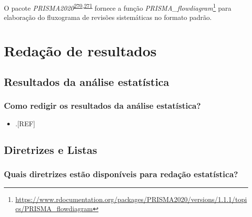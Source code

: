 \documentclass[
  a4paper,
]{book}
\providecommand{\tightlist}{%
  \setlength{\itemsep}{0pt}\setlength{\parskip}{0pt}}
\renewcommand{\href}[2]{#2\footnote{\url{#1}}}
\newenvironment{infobox}[1]
  {
  \begin{itemize}
  \renewcommand{\labelitemi}{
    \raisebox{-.7\height}[0pt][0pt]{
      {\setkeys{Gin}{width=3em,keepaspectratio}
        \texttt{[image: \#1]}}
    }
  }
  \setlength{\fboxsep}{1em}
  \begin{blackbox}
  \item
  }
  {
  \end{blackbox}
  \end{itemize}
  }
\begin{document}
\begin{infobox}{images/Rlogo}
O pacote \emph{PRISMA2020}\textsuperscript{\protect\hyperlink{ref-PRISMA2020-2}{270},\protect\hyperlink{ref-PRISMA2020}{271}} fornece a função \href{https://www.rdocumentation.org/packages/PRISMA2020/versions/1.1.1/topics/PRISMA_flowdiagram}{\emph{PRISMA\_flowdiagram}} para elaboração do fluxograma de revisões sistemáticas no formato padrão.

\end{infobox}

\hypertarget{redacao}{%
\chapter{\texorpdfstring{\textbf{Redação de resultados}}{Redação de resultados}}\label{redacao}}

\hypertarget{resultados-analise-estatistica}{%
\section{Resultados da análise estatística}\label{resultados-analise-estatistica}}

\hypertarget{como-redigir-os-resultados-da-anuxe1lise-estatuxedstica}{%
\subsection{Como redigir os resultados da análise estatística?}\label{como-redigir-os-resultados-da-anuxe1lise-estatuxedstica}}

\begin{itemize}
\tightlist
\item
  .{[}REF{]}
\end{itemize}

\hypertarget{diretrizes-checklists}{%
\section{\texorpdfstring{\textbf{Diretrizes e Listas}}{Diretrizes e Listas}}\label{diretrizes-checklists}}

\hypertarget{quais-diretrizes-estuxe3o-disponuxedveis-para-redauxe7uxe3o-estatuxedstica}{%
\subsection{Quais diretrizes estão disponíveis para redação estatística?}\label{quais-diretrizes-estuxe3o-disponuxedveis-para-redauxe7uxe3o-estatuxedstica}}
\end{document}
